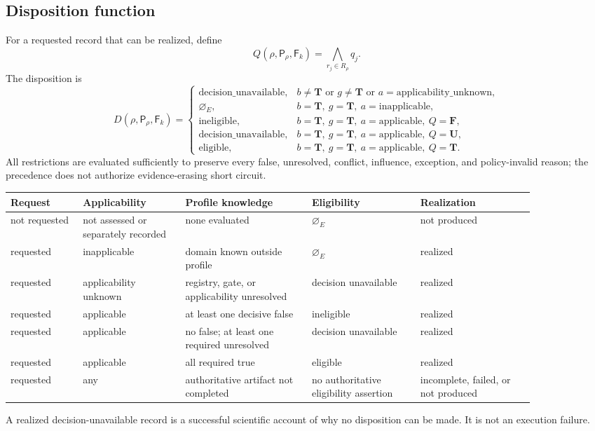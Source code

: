 \subsection{Disposition function}

For a requested record that can be realized, define
\[
 Q(\rho,\mathsf P_\rho,\mathsf F_k)
   =\bigwedge_{r_j\in R_\rho}q_j.
\]
The disposition is
\[
 D(\rho,\mathsf P_\rho,\mathsf F_k)=
 \begin{cases}
 \mathrm{decision\_unavailable},
   &b\ne\mathbf T\text{ or }g\ne\mathbf T
      \text{ or }a=\mathrm{applicability\_unknown},\\
 \varnothing_E,
   &b=\mathbf T,\ g=\mathbf T,\ a=\mathrm{inapplicable},\\
 \mathrm{ineligible},
   &b=\mathbf T,\ g=\mathbf T,\ a=\mathrm{applicable},\ Q=\mathbf F,\\
 \mathrm{decision\_unavailable},
   &b=\mathbf T,\ g=\mathbf T,\ a=\mathrm{applicable},\ Q=\mathbf U,\\
 \mathrm{eligible},
   &b=\mathbf T,\ g=\mathbf T,\ a=\mathrm{applicable},\ Q=\mathbf T.
 \end{cases}
\]
All restrictions are evaluated sufficiently to preserve every false,
unresolved, conflict, influence, exception, and policy-invalid reason; the
precedence does not authorize evidence-erasing short circuit.

\begin{center}
\begin{longtable}{@{}p{0.12\linewidth}p{0.17\linewidth}p{0.21\linewidth}p{0.18\linewidth}p{0.19\linewidth}@{}}
\toprule
Request & Applicability & Profile knowledge & Eligibility & Realization \\
\midrule
\endhead
not requested & not assessed or separately recorded & none evaluated &
$\varnothing_E$ & not produced \\
requested & inapplicable & domain known outside profile & $\varnothing_E$ &
realized \\
requested & applicability unknown & registry, gate, or applicability
unresolved & decision unavailable & realized \\
requested & applicable & at least one decisive false & ineligible & realized \\
requested & applicable & no false; at least one required unresolved &
decision unavailable & realized \\
requested & applicable & all required true & eligible & realized \\
requested & any & authoritative artifact not completed & no authoritative
eligibility assertion & incomplete, failed, or not produced \\
\bottomrule
\end{longtable}
\end{center}
A realized decision-unavailable record is a successful scientific account of
why no disposition can be made. It is not an execution failure.

